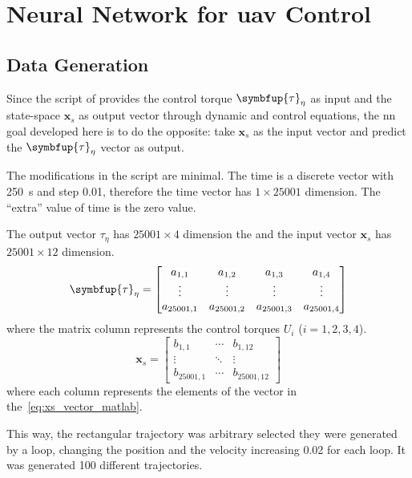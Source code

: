 \section{Neural Network for \gls*{uav} Control}

\subsection{Data Generation}

Since the script of \citet{geronel2023} provides the control torque \(\symbfup{\tau}_{\eta}\) as input and the state-space \(\symbf{x}_s\) as output vector through dynamic and control equations, the \gls*{nn} goal developed here is to do the opposite: take \(\symbf{x}_s\) as the input vector and predict the \(\symbfup{\tau}_{\eta}\) vector as output.

The modifications in the script are minimal.
The time is a discrete vector with \SI{250}{s} and step 0.01, therefore the time vector has \(1\times 25001\) dimension.
The ``extra'' value of time is the zero value.

The output vector \(\tau_{\eta}\) has \(25001\times 4\) dimension the and the input vector \(\symbf{x}_s\) has  \(25001\times 12\) dimension.
%
\begin{equation}\label{eq:tau_input}
    \symbfup{\tau}_{\eta} = \begin{bmatrix}
        a_{1,1}      & a_{1,2}      & a_{1,3}      & a_{1,4} \\
        \vdots       & \vdots       & \vdots       & \vdots  \\
        a_{25001, 1} & a_{25001, 2} & a_{25001, 3} & a_{25001, 4} 
    \end{bmatrix}
\end{equation}
%
where the matrix column represents the control torques \(U_i\) (\(i=1,2,3,4\)).
%
\begin{equation}\label{eq:xs_output}
    \symbf{x}_s = \begin{bmatrix}
        b_{1,1}      & \cdots & b_{1,12} \\
        \vdots       & \ddots & \vdots \\
        b_{25001, 1} & \cdots & b_{25001, 12} 
    \end{bmatrix}
\end{equation}
%
where each column represents the elements of the vector in the~\cref{eq:xs_vector_matlab}.

This way, the rectangular trajectory was arbitrary selected they were generated by a loop, changing the position and the velocity increasing 0.02 for each loop.
It was generated 100 different trajectories.

